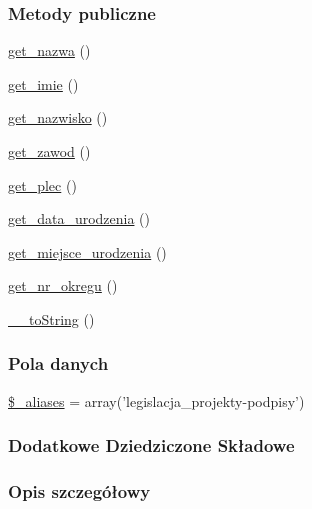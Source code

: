 \subsubsection*{Metody publiczne}
\begin{DoxyCompactItemize}
\item 
\hyperlink{classep___legislacja___projekt___podpis_ac0818f0049d7b84f08f77128f54cee36}{get\-\_\-nazwa} ()
\item 
\hyperlink{classep___legislacja___projekt___podpis_ac4b0c85dc2a130038f2d118dbd0c3d77}{get\-\_\-imie} ()
\item 
\hyperlink{classep___legislacja___projekt___podpis_abdd1d7ff92508da7f748ba1feec97af0}{get\-\_\-nazwisko} ()
\item 
\hyperlink{classep___legislacja___projekt___podpis_af80ca8310b60004454dd02a387deaa2c}{get\-\_\-zawod} ()
\item 
\hyperlink{classep___legislacja___projekt___podpis_ac7f9af5c3fa024e4c26a7b6bd4ce4bb4}{get\-\_\-plec} ()
\item 
\hyperlink{classep___legislacja___projekt___podpis_a880b240cd2d8c336fd1709bf0cb1ae2c}{get\-\_\-data\-\_\-urodzenia} ()
\item 
\hyperlink{classep___legislacja___projekt___podpis_ac57c08ec5e394a19c5bd9280c8376182}{get\-\_\-miejsce\-\_\-urodzenia} ()
\item 
\hyperlink{classep___legislacja___projekt___podpis_a2645a9f0aa5b0ccc482943348c033d0a}{get\-\_\-nr\-\_\-okregu} ()
\item 
\hyperlink{classep___legislacja___projekt___podpis_a7516ca30af0db3cdbf9a7739b48ce91d}{\-\_\-\-\_\-to\-String} ()
\end{DoxyCompactItemize}
\subsubsection*{Pola danych}
\begin{DoxyCompactItemize}
\item 
\hyperlink{classep___legislacja___projekt___podpis_ab4e31d75f0bc5d512456911e5d01366b}{\$\-\_\-aliases} = array('legislacja\-\_\-projekty-\/podpisy')
\end{DoxyCompactItemize}
\subsubsection*{Dodatkowe Dziedziczone Składowe}


\subsubsection{Opis szczegółowy}


